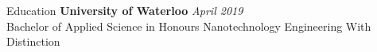 \documentclass{resume}
\begin{document}
  \vspace{-0.5em}

  \begin{rSection}{Education}
    {\bf University of Waterloo} \hfill {\em April 2019} \\ 
    { Bachelor of Applied Science in Honours Nanotechnology Engineering With Distinction }
  \end{rSection}
\end{document}
